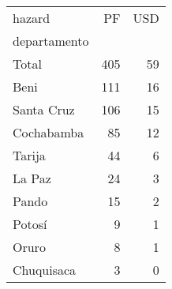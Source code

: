 \begin{tabular}{lrr}
\toprule
hazard &   PF &  USD \\
departamento &      &      \\
\midrule
Total        &  405 &   59 \\
Beni         &  111 &   16 \\
Santa Cruz   &  106 &   15 \\
Cochabamba   &   85 &   12 \\
Tarija       &   44 &    6 \\
La Paz       &   24 &    3 \\
Pando        &   15 &    2 \\
Potosí       &    9 &    1 \\
Oruro        &    8 &    1 \\
Chuquisaca   &    3 &    0 \\
\bottomrule
\end{tabular}
